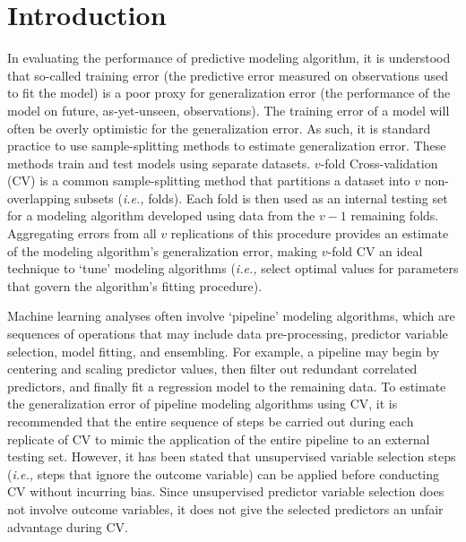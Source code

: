 \documentclass[AMA,STIX1COL,doublespace]{WileyNJD-v2}
\begin{document}

\maketitle

\section{Introduction}

In evaluating the performance of predictive modeling algorithm, it is
understood that so-called training error (the predictive error measured
on observations used to fit the model) is a poor proxy for
generalization error (the performance of the model on future,
as-yet-unseen, observations).\citep{kuhn2013applied} The training error
of a model will often be overly optimistic for the generalization error.
As such, it is standard practice to use sample-splitting methods to
estimate generalization error. These methods train and test models using
separate datasets. \(v\)-fold Cross-validation (CV) is a common
sample-splitting method that partitions a dataset into \(v\)
non-overlapping subsets (\textit{i.e., }folds).\cite{arlot2010survey}
Each fold is then used as an internal testing set for a modeling
algorithm developed using data from the \(v-1\) remaining folds.
Aggregating errors from all \(v\) replications of this procedure
provides an estimate of the modeling algorithm's generalization error,
making \(v\)-fold CV an ideal technique to `tune' modeling algorithms
(\textit{i.e., }select optimal values for parameters that govern the
algorithm's fitting procedure).

Machine learning analyses often involve `pipeline' modeling algorithms,
which are sequences of operations that may include data pre-processing,
predictor variable selection, model fitting, and ensembling.\citep{mlr3}
For example, a pipeline may begin by centering and scaling predictor
values, then filter out redundant correlated predictors, and finally fit
a regression model to the remaining data. To estimate the generalization
error of pipeline modeling algorithms using CV, it is recommended that
the entire sequence of steps be carried out during each replicate of CV
to mimic the application of the entire pipeline to an external testing
set. However, it has been stated that unsupervised variable selection
steps (\textit{i.e., }steps that ignore the outcome variable) can be
applied before conducting CV without incurring
bias.\citep{hastie2009elements} Since unsupervised predictor variable
selection does not involve outcome variables, it does not give the
selected predictors an unfair advantage during CV.
\end{document}
